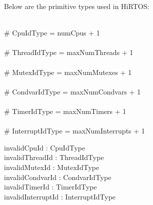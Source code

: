 \documentclass[11pt,letterpaper,twoside,openany]{book}
\begin{document}
Below are the primitive types used in HiRTOS:

\begin{zed}
[CpuIdType] \\
\# CpuIdType = numCpus + 1 \\
[ThreadIdType] \\
\# ThreadIdType = maxNumThreads + 1 \\
[MutexIdType] \\
\# MutexIdType = maxNumMutexes + 1 \\
[CondvarIdType] \\
\# CondvarIdType = maxNumCondvars + 1 \\
[TimerIdType] \\
\# TimerIdType = maxNumTimers + 1 \\
[InterruptIdType] \\
\# InterruptIdType = maxNumInterrupts + 1 \\
\end{zed}

\begin{axdef}
   invalidCpuId : CpuIdType \\
   invalidThreadId : ThreadIdType \\
   invalidMutexId : MutexIdType \\
   invalidCondvarId : CondvarIdType \\
   invalidTimerId : TimerIdType \\
   invalidInterruptId : InterruptIdType \\
\end{axdef}
\end{document}
